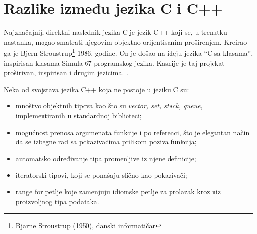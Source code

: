 \documentclass[a4paper]{article}
\begin{document}
{\section{Razlike između jezika C i C++}
Najznačajniji direktni naslednik jezika C je jezik C++ koji se, u trenutku nastanka, mogao smatrati njegovim objektno-orijentisanim proširenjem. Kreirao ga je Bjern Stroustrup\footnote{Bjarne Stroustrup (1950), danski informatičar} 1986. godine. On je došao na ideju jezika ``C sa klasama'', inspirisan klasama Simula 67 programskog jezika. Kasnije je taj projekat proširivan, inspirisan i drugim jezicima. . 

Neka od svojstava jezika C++ koja ne postoje u jeziku C su:
\begin{itemize}
    \item mnoštvo objektnih tipova kao što su {\em vector, set, stack, queue}, implementiranih u standardnoj biblioteci;
    \item mogućnost prenosa argumenata funkcije i po referenci, što je elegantan način da se izbegne rad sa pokazivačima prilikom poziva funkcija;
    \item automatsko određivanje tipa promenljive iz njene definicije;
    \item iteratorski tipovi, koji se ponašaju slično kao pokazivači;
    \item range for petlje koje zamenjuju idiomske petlje za prolazak kroz niz proizvoljnog tipa podataka.
\end{itemize}

}
\end{document}
